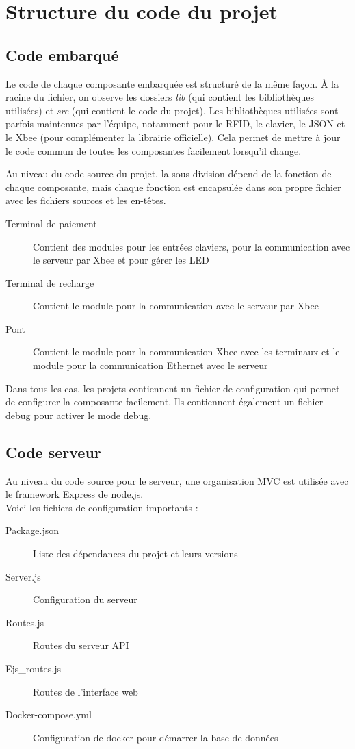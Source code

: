 \section{Structure du code du projet}
	\subsection{Code embarqué}
	Le code de chaque composante embarquée est structuré de la même façon. À la racine du fichier, on observe les dossiers \emph{lib} (qui contient les bibliothèques utilisées) et \emph{src} (qui contient le code du projet). Les bibliothèques utilisées sont parfois maintenues par l’équipe, notamment pour le RFID, le clavier, le JSON et le Xbee (pour complémenter la librairie officielle). Cela permet de mettre à jour le code commun de toutes les composantes facilement lorsqu’il change. 

	Au niveau du code source du projet, la sous-division dépend de la fonction de chaque composante, mais chaque fonction est encapsulée dans son propre fichier avec les fichiers sources et les en-têtes. 
	\begin{description}
		\item[Terminal de paiement] Contient des modules pour les entrées claviers, pour la communication avec le serveur par Xbee et pour gérer les LED
		\item[Terminal de recharge] Contient le module pour la communication avec le serveur par Xbee
		\item[Pont] Contient le module pour la communication Xbee avec les terminaux et le module pour la communication Ethernet avec le serveur 
	\end{description}
	
	Dans tous les cas, les projets contiennent un fichier de configuration qui permet de configurer la composante facilement. Ils contiennent également un fichier debug pour activer le mode debug.

	
	\subsection{Code serveur}
	Au niveau du code source pour le serveur, une organisation MVC est utilisée avec le framework Express de node.js. \\

	\noindent Voici les fichiers de configuration importants :
 	\begin{description}
 		\item[Package.json] Liste des dépendances du projet et leurs versions 
 		\item[Server.js] Configuration du serveur
 		\item[Routes.js] Routes du serveur API
 		\item[Ejs\_routes.js] Routes de l’interface web
 		\item[Docker-compose.yml] Configuration de docker pour démarrer la base de données
 	\end{description}

